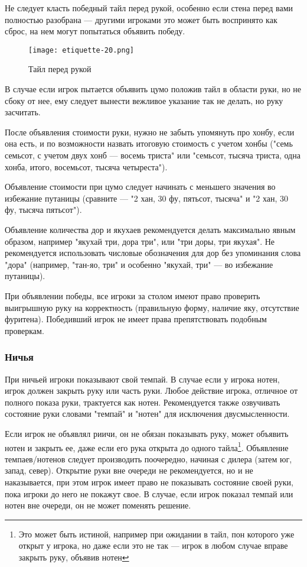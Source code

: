 Не следует класть победный тайл перед рукой, особенно если стена перед вами полностью разобрана --- другими игроками это может быть воспринято как сброс, на нем могут попытаться объявить победу.

\begin{figure}[H]
	\centering
	\texttt{[image: etiquette-20.png]}
	\caption{Тайл перед рукой}
\end{figure}

В случае если игрок пытается объявить цумо положив тайл в области руки, но не сбоку от нее, ему следует вынести вежливое указание так не делать, но руку засчитать.

После объявления стоимости руки, нужно не забыть упомянуть про хонбу, если она есть, и по возможности назвать итоговую стоимость с учетом хонбы ("семь семьсот, с учетом двух хонб --- восемь триста" или "семьсот, тысяча триста, одна хонба, итого, восемьсот, тысяча четыреста").

Объявление стоимости при цумо следует начинать с меньшего значения во избежание путаницы (сравните --- "2 хан, 30 фу, пятьсот, тысяча" и "2 хан, 30 фу, тысяча пятьсот").

Объявление количества дор и якухаев рекомендуется делать максимально явным образом, например "якухай три, дора три", или "три доры, три якухая". Не рекомендуется использовать числовые обозначения для дор без упоминания слова "дора" (например, "тан-яо, три" и особенно "якухай, три" --- во избежание путаницы).

При объявлении победы, все игроки за столом имеют право проверить выигрышную руку на корректность (правильную форму, наличие яку, отсутствие фуритена). Победивший игрок не имеет права препятствовать подобным проверкам.

\subsubsection{Ничья}

При ничьей игроки показывают свой темпай. В случае если у игрока нотен, игрок должен закрыть руку или часть руки. Любое действие игрока, отличное от полного показа руки, трактуется как нотен. Рекомендуется также озвучивать состояние руки словами "темпай" и "нотен" для исключения двусмысленности.

Если игрок не объявлял риичи, он не обязан показывать руку, может объявить нотен и закрыть ее, даже если его рука открыта до одного тайла\footnote{Это может быть истиной, например при ожидании в тайл, пон которого уже открыт у игрока, но даже если это не так --- игрок в любом случае вправе закрыть руку, объявив нотен}. Объявление темпаев/нотенов следует производить поочередно, начиная с дилера (затем юг, запад, север). Открытие руки вне очереди не рекомендуется, но и не наказывается, при этом игрок имеет право не показывать состояние своей руки, пока игроки до него не покажут свое. В случае, если игрок показал темпай или нотен вне очереди, он не может поменять решение.

